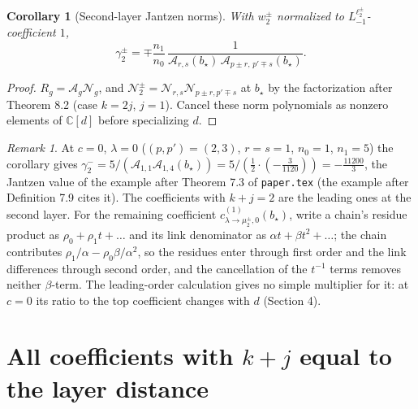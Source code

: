 \documentclass[11pt]{article}
\newtheorem{corollary}[theorem]{Corollary}
\theoremstyle{remark}
\newtheorem{remark}[theorem]{Remark}
\begin{document}
\begin{corollary}[Second-layer Jantzen norms]\label{cor:gamma2}
With $w^\pm_2$ normalized to $L_{-1}^{\ell^\pm_2}$-coefficient $1$,
\[
 \gamma^\pm_2=\mp\frac{n_1}{n_0}\,
 \frac{1}{\mathcal A_{r,s}(b_\star)\,\mathcal A_{p\pm r,\,p'\mp s}(b_\star)}.
\]
\end{corollary}

\begin{proof}
$R_g=\mathcal A_g\mathcal N_g$, and $\mathcal N^\pm_2=\mathcal N_{r,s}\mathcal
N_{p\pm r,p'\mp s}$ at $b_\star$ by the factorization after Theorem 8.2
(case $k=2j$, $j=1$).  Cancel these norm polynomials as nonzero elements of
$\mathbb C[d]$ before specializing $d$.
\end{proof}

\begin{remark}
At $c=0$, $\lambda=0$ ($(p,p')=(2,3)$, $r=s=1$, $n_0=1$, $n_1=5$) the
corollary gives $\gamma^-_2=5/(\mathcal A_{1,1}\mathcal A_{1,4}(b_\star))
=5/(\frac12\cdot(-\frac3{1120}))=-\frac{11200}3$, the Jantzen value of the
example after Theorem 7.3 of \texttt{paper.tex} (the example after
Definition 7.9 cites it).  The coefficients with $k+j=2$ are the leading ones
at the second layer.  For the remaining coefficient
$c^{(1)}_{\lambda\to\mu^\pm_2,0}(b_\star)$, write a chain's residue product as
$\rho_0+\rho_1t+\dots$ and its link denominator as $\alpha t+\beta t^2+\dots$;
the chain contributes $\rho_1/\alpha-\rho_0\beta/\alpha^2$, so the residues enter
through first order and the link differences through second order, and the
cancellation of the $t^{-1}$ terms removes neither $\beta$-term.  The
leading-order calculation gives no simple multiplier for it: at $c=0$ its ratio
to the top coefficient changes with $d$ (Section 4).
\end{remark}

\section{All coefficients with $k+j$ equal to the layer distance}
\end{document}
